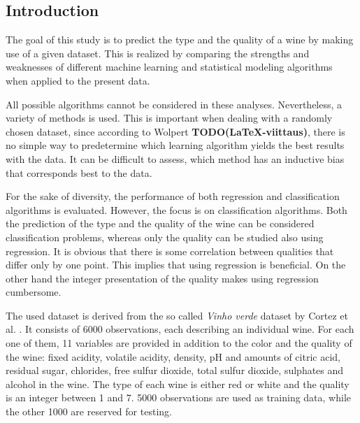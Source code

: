\documentclass[twoside]{article}
\newcommand{\todo}[1]{\textbf{TODO(#1)}}
\begin{document}
\begin{multicols}{2} %

\section{Introduction}

The goal of this study is to predict the type and the quality of a wine by making use of a given dataset.
This is realized by comparing the strengths and weaknesses of different machine learning 
and statistical modeling algorithms when applied to the present data.
 
All possible algorithms cannot be considered in these analyses. Nevertheless,
a variety of methods is used. This is important when dealing with a randomly chosen dataset, since according to
Wolpert \todo{\LaTeX-viittaus}, there is no simple way to predetermine which
learning algorithm yields the best results with the data. It can be difficult to assess,
which method has an inductive bias that corresponds best to the data.

For the sake of diversity, the performance of both regression and classification algorithms is evaluated.
However, the focus is on classification algorithms. 
Both the prediction of the type and the quality of the wine can be considered
classification problems, whereas only the quality can be studied also using regression. It is obvious that
there is some correlation between qualities that differ only by one point. This implies that
using regression is beneficial. On the other hand the integer presentation of the quality makes using regression cumbersome.

The used dataset is derived from the so called \emph{Vinho verde} dataset by Cortez et al. \cite{CorCer09}.
It consists of 6000 observations, each describing an individual wine. For each one of them, 11 variables are provided in addition
to the color and the quality of the wine: fixed acidity, volatile acidity, density, pH and amounts of citric acid, residual sugar, chlorides, 
free sulfur dioxide, total sulfur dioxide, sulphates and alcohol in the wine. The type of each wine is either red or white 
and the quality is an integer between 1 and 7. 5000 observations are used as training data, while the other 1000 are reserved for testing.


\end{multicols}
\end{document}
